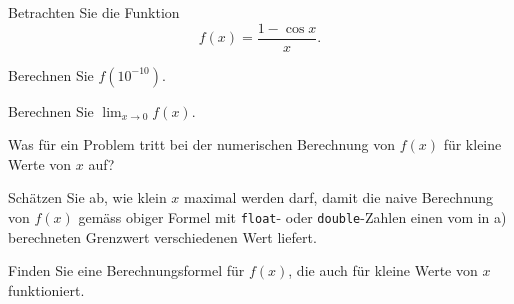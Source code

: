 Betrachten Sie die Funktion
\[
f(x) = \frac{1-\cos x}{x}.
\]
%
\begin{teilaufgaben}
\item Berechnen Sie $f(10^{-10})$.
\item Berechnen Sie $\displaystyle \lim_{x\to 0} f(x)$.
\item Was für ein Problem tritt bei der numerischen Berechnung von
$f(x)$ für kleine Werte von $x$ auf?
\item Schätzen Sie ab, wie klein  $x$ maximal werden darf, damit
die naive Berechnung von $f(x)$ gemäss obiger Formel mit
\texttt{float}- oder \texttt{double}-Zahlen einen vom in a) berechneten
Grenzwert verschiedenen Wert liefert.
\item Finden Sie eine Berechnungsformel für $f(x)$, die auch für kleine
Werte von $x$ funktioniert.
\end{teilaufgaben}

